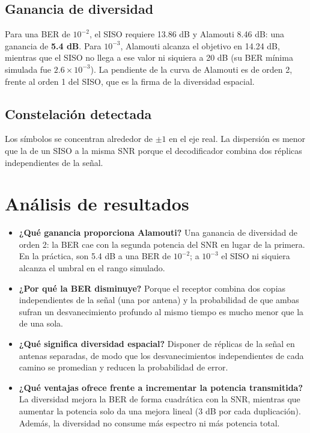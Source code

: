 \documentclass[11pt,a4paper]{article}
\begin{document}
\subsection{Ganancia de diversidad}

Para una BER de $10^{-2}$, el SISO requiere 13.86 dB y Alamouti 8.46 dB: una ganancia de
\textbf{5.4 dB}. Para $10^{-3}$, Alamouti alcanza el objetivo en 14.24 dB, mientras que el
SISO no llega a ese valor ni siquiera a 20 dB (su BER mínima simulada fue
$2.6\times10^{-3}$). La pendiente de la curva de Alamouti es de orden 2, frente al orden 1
del SISO, que es la firma de la diversidad espacial.

\subsection{Constelación detectada}


Los símbolos se concentran alrededor de $\pm1$ en el eje real. La dispersión es menor que
la de un SISO a la misma SNR porque el decodificador combina dos réplicas independientes
de la señal.

\section{Análisis de resultados}

\begin{itemize}
  \item \textbf{¿Qué ganancia proporciona Alamouti?} Una ganancia de diversidad de orden 2:
        la BER cae con la segunda potencia del SNR en lugar de la primera. En la práctica,
        son 5.4 dB a una BER de $10^{-2}$; a $10^{-3}$ el SISO ni siquiera alcanza el umbral en el rango simulado.
  \item \textbf{¿Por qué la BER disminuye?} Porque el receptor combina dos copias
        independientes de la señal (una por antena) y la probabilidad de que ambas sufran
        un desvanecimiento profundo al mismo tiempo es mucho menor que la de una sola.
  \item \textbf{¿Qué significa diversidad espacial?} Disponer de réplicas de la señal en
        antenas separadas, de modo que los desvanecimientos independientes de cada camino
        se promedian y reducen la probabilidad de error.
  \item \textbf{¿Qué ventajas ofrece frente a incrementar la potencia transmitida?} La
        diversidad mejora la BER de forma cuadrática con la SNR, mientras que aumentar la
        potencia solo da una mejora lineal (3 dB por cada duplicación). Además, la
        diversidad no consume más espectro ni más potencia total.
\end{itemize}
\end{document}
